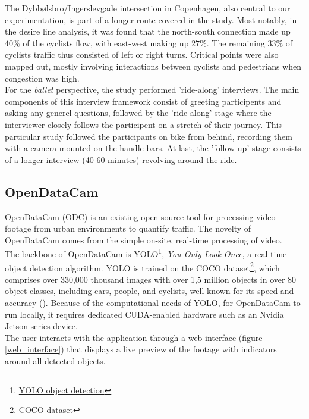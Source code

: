 The Dybbølsbro/Ingerslevgade intersection in Copenhagen, also central to our experimentation, is part of a longer route covered in the study.
Most notably, in the desire line analysis, it was found that the north-south connection made up $40\%$ of the cyclists flow, with east-west making up
$27\%$. The remaining $33\%$ of cyclists traffic thus consisted of left or right turns.
Critical points were also mapped out, mostly involving interactions between cyclists and pedestrians when congestion was high.
\ \\

For the \textit{ballet} perspective, the study performed 'ride-along' interviews. The main components of this interview framework 
consist of greeting participents and asking any generel questions, followed by the 'ride-along' stage where the interviewer closely follows 
the participent on a stretch of their journey. This particular study followed the participants on bike from behind, recording them with a 
camera mounted on the handle bars. At last, the 'follow-up' stage consists of a longer interview (40-60 minutes) revolving around the ride.

\subsection{OpenDataCam}
OpenDataCam (ODC) is an existing open-source tool for processing video footage from urban environments to quantify
traffic. The novelty of OpenDataCam comes from the simple on-site, real-time processing of video. 
\ \\

The backbone of OpenDataCam is YOLO\footnote{\href{https://pjreddie.com/darknet/yolo/}{YOLO object detection}}, \textit{You Only Look Once}, a real-time object detection algorithm. 
YOLO is trained on the COCO dataset\footnote{\href{https://cocodataset.org}{COCO dataset}}, which comprises over 330,000 thousand images
with over 1,5 million objects in over 80 object classes, including cars, people, and cyclists, well known for its speed and accuracy (\cite{redmon2016look}). 
Because of the computational needs of YOLO, for OpenDataCam to run locally, it requires dedicated CUDA-enabled hardware such as an Nvidia Jetson-series device. 
\ \\

The user interacts with the application through a web interface (figure \ref{web_interface}) that displays a live preview of the footage with
indicators around all detected objects.

